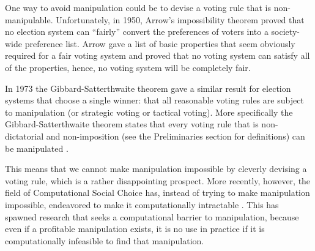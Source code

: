 	One way to avoid manipulation could be to devise a voting rule that is non-manipulable. Unfortunately, in 1950, Arrow's impossibility theorem \cite{arrow1950difficulty} proved that no election system can ``fairly'' convert the preferences of voters into a society-wide preference list. Arrow gave a list of basic properties that seem obviously required for a fair voting system and proved that no voting system can satisfy all of the properties, hence, no voting system will be completely fair.

	In 1973 the Gibbard-Satterthwaite theorem gave a similar result for election systems that choose a single winner: that all reasonable voting rules are subject to manipulation (or strategic voting or tactical voting). More specifically the Gibbard-Satterthwaite theorem states that every voting rule that is non-dictatorial and non-imposition (see the Preliminaries section for definitions) can be manipulated \cite{gibbard1973manipulation, satterthwaite1975strategy, duggan2000strategic}.

	This means that we cannot make manipulation impossible by cleverly devising a voting rule, which is a rather disappointing prospect. More recently, however, the field of Computational Social Choice has, instead of trying to make manipulation impossible, endeavored to make it computationally intractable \cite{chevaleyre2007short}. This has spawned research that seeks a computational barrier to manipulation, because even if a profitable manipulation exists, it is no use in practice if it is computationally infeasible to find that manipulation.
